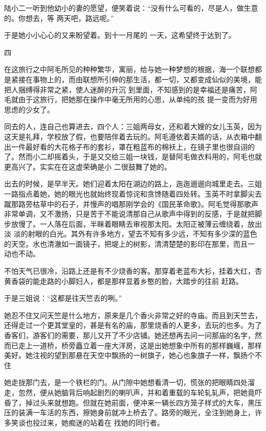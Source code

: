 \documentclass{article}
\begin{document}
陆小二一听到他幼小的妻的愿望，便笑着说：“没有什么可看的，尽是人，做生意的。你想去，等
两天吧，路远呢。” 

于是她小小心心的又来盼望着。到十一月尾的
一天，这希望终于达到了。 


四 

在这旅行之中阿毛所见的种种繁华，寓丽，给与她一种梦想的根据，海一个联想都是紧接在事物上的，而由联想所引伸的那生活，都一切，又都变成仙似的美境，能把人捆缚得非常之紧，使人迷醉的升沉
\newpage
到里面，不知感到的是幸福还是痛苦，阿毛就由于这旅行，把她那在操作中毫无所用的心思，从单纯的孩
提一变而为好用思虑的少女了。 

同去的人，连自己也算进去，四个人：三姐两母女，还和着大嫂的女儿玉英，因为这天是礼拜，学校放了假，也要陪伴着去玩的。阿毛遵依着夫婿的话，从衣箱中翻出一件最好看的大花格子布的套衫，罩在粗蓝布的棉袄上，在镜子里也很自诩的了。然而小二却摇着头，于是又交给三姐一块钱，是替阿毛做衣料用的，阿毛也就更高兴了。实实在在这虚荣确是小
二很鼓舞了她的。 

出去的时候，是早半天。她们迎着太阳在湖边的路上，迤迤逦逦向城里走去。三姐一路指点着她，她的眼光也就始终现着惊诧和贪馋随着四处转。玉英不时拿脚尖去蹴那路旁枯草中的石子，并慢声的唱那刚学会的《国民革命歌》。阿毛觉得那歌声非常单调，又不激扬，只是苦于不能说清那自己从歌声中得到的反感，于是就把脚步放慢了。一人落在后面，半眯着眼睛去审视那太阳。太阳正被薄云缠绕着，放出淡
\newpage
淡的射眼的白光。其外有许多地方，望去不知有多少远，不知有多少深的蓝色的天空。水也清澈如一面镜子，把堤上的树影，清清楚楚的影印在那里，而且一
动也不动。 

不怕天气已很冷，沿路上还是有不少烧香的客。那穿着老蓝布大衫，挂着大红，杏黄香袋的能走路的小脚妇人，都是那样显着乡憨的脸，大踏步的往前
赶路。 


于是三姐说：“这都是往天竺去的咧。” 

她忍不住又问天竺是什么地方，原来是几个香火非常之好的寺庙。而且到天竺去，还得走过一个更其堂皇的，甚是有名的庙，那里烧香的人更多，去玩的也多。为了香客们，游客们的需要，那儿又开了不少店铺。她还想再去问一问那庙的名字，然而已走上一道桥，桥旁矗立着一座大洋房，这是出她想象中所有的那样巍峨，那样美好。她注视的望到那悬在天空中飘扬的一树旗子，她心也象旗子一样，飘扬个不住

\newpage

她走拢那门去，是一个铁栏的门。从门隙中她想看清一切，慌张的把眼睛四处溜走，忽然，便从她脑背后响起剧烈的喇叭声，并和着重载的车轮轧轧声，把她竟吓昏了，掉过头来就想跑。但就在她前面，便冲来一辆长四方笼子样式的大车，黑压压的装满一车活的东西，擦她身前就冲上桥去了。路旁的眼光，全注到她身上，许多笑谈也投过来，她痴迷的站着在
找她的同行者。 
\end{document}
